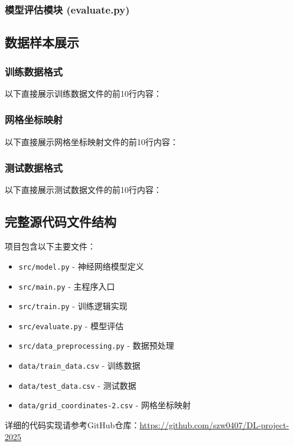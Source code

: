 \documentclass{article}
\begin{document}
\subsubsection{模型评估模块 (evaluate.py)}


\subsection{数据样本展示}
\subsubsection{训练数据格式}
以下直接展示训练数据文件的前10行内容：

\subsubsection{网格坐标映射}
以下直接展示网格坐标映射文件的前10行内容：

\subsubsection{测试数据格式}
以下直接展示测试数据文件的前10行内容：

\subsection{完整源代码文件结构}

项目包含以下主要文件：

\begin{itemize}
    \item \texttt{src/model.py} - 神经网络模型定义
    \item \texttt{src/main.py} - 主程序入口
    \item \texttt{src/train.py} - 训练逻辑实现
    \item \texttt{src/evaluate.py} - 模型评估
    \item \texttt{src/data\_preprocessing.py} - 数据预处理
    \item \texttt{data/train\_data.csv} - 训练数据
    \item \texttt{data/test\_data.csv} - 测试数据
    \item \texttt{data/grid\_coordinates-2.csv} - 网格坐标映射
\end{itemize}

详细的代码实现请参考GitHub仓库：\url{https://github.com/szw0407/DL-project-2025}
\end{document}
